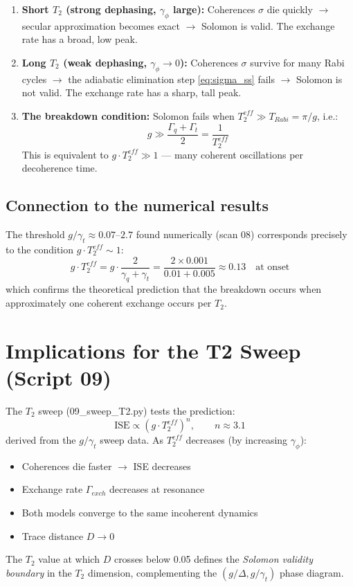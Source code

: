 \documentclass[12pt,a4paper]{article}
\newcommand{\gq}{\gamma_q}
\newcommand{\gt}{\gamma_t}
\begin{document}
\begin{enumerate}
\item \textbf{Short $T_2$ (strong dephasing, $\gamma_\phi$ large):}
    Coherences $\sigma$ die quickly $\to$ secular approximation becomes
    exact $\to$ Solomon is valid. The exchange rate has a broad, low peak.

\item \textbf{Long $T_2$ (weak dephasing, $\gamma_\phi \to 0$):}
    Coherences $\sigma$ survive for many Rabi cycles $\to$
    the adiabatic elimination step \eqref{eq:sigma_ss} fails $\to$
    Solomon is not valid. The exchange rate has a sharp, tall peak.

\item \textbf{The breakdown condition:}
    Solomon fails when $T_2^{eff} \gg T_{Rabi} = \pi/g$, i.e.:
    \begin{equation}
        g \gg \frac{\Gamma_q + \Gamma_t}{2} = \frac{1}{T_2^{eff}}
    \end{equation}
    This is equivalent to $g \cdot T_2^{eff} \gg 1$ — many coherent
    oscillations per decoherence time.
\end{enumerate}

\subsection{Connection to the numerical results}

The threshold $g/\gamma_t \approx 0.07$--$2.7$ found numerically
(scan 08) corresponds precisely to the condition
$g \cdot T_2^{eff} \sim 1$:
\begin{equation}
    g \cdot T_2^{eff}
    = g \cdot \frac{2}{\gq + \gt}
    = \frac{2 \times 0.001}{0.01 + 0.005}
    \approx 0.13 \quad \text{at onset}
\end{equation}
which confirms the theoretical prediction that the breakdown occurs
when approximately one coherent exchange occurs per $T_2$.

\section{Implications for the T2 Sweep (Script 09)}

The $T_2$ sweep (09\_sweep\_T2.py) tests the prediction:
\begin{equation}
    \text{ISE} \propto (g \cdot T_2^{eff})^n, \qquad n \approx 3.1
\end{equation}
derived from the $g/\gamma_t$ sweep data. As $T_2^{eff}$ decreases
(by increasing $\gamma_\phi$):
\begin{itemize}
    \item Coherences die faster $\to$ ISE decreases
    \item Exchange rate $\Gamma_{exch}$ decreases at resonance
    \item Both models converge to the same incoherent dynamics
    \item Trace distance $D \to 0$
\end{itemize}

The $T_2$ value at which $D$ crosses below 0.05 defines the
\emph{Solomon validity boundary} in the $T_2$ dimension, complementing
the $(g/\Delta, g/\gamma_t)$ phase diagram.
\end{document}
